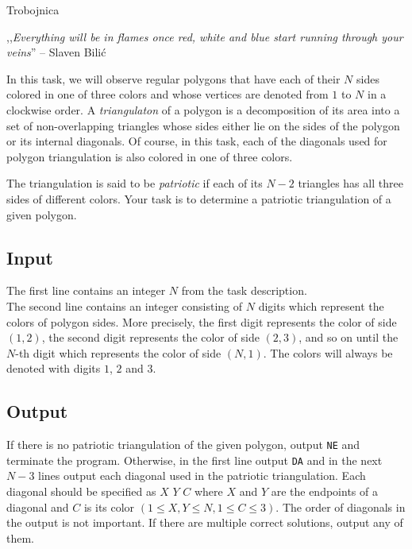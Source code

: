 \begin{statement}[
  problempoints=110,
  timelimit=1 second,
  memorylimit=512 MiB,
]{Trobojnica}



,,\textit{Everything will be in flames once red, white and blue start running through your veins}''
-- Slaven Bilić

In this task, we will observe regular polygons that have each of their $N$ sides
colored in one of three colors and whose vertices are denoted from $1$ to $N$
in a clockwise order. A \textit{triangulaton} of a polygon is a decomposition of
its area into a set of non-overlapping triangles whose sides either lie on the
sides of the polygon or its internal diagonals. Of course, in this task, each of
the diagonals used for polygon triangulation is also colored in one of three
colors.

The triangulation is said to be \textit{patriotic} if each of its $N-2$
triangles has all three sides of different colors. Your task is to determine
a patriotic triangulation of a given polygon.

\subsection*{Input}
The first line contains an integer $N$ from the task description. \\
The second line contains an integer consisting of $N$ digits which represent
the colors of polygon sides. More precisely, the first digit represents
the color of side $(1,2)$, the second digit represents the color of side $(2,3)$,
and so on until the $N$-th digit which represents the color of side $(N,1)$. The
colors will always be denoted with digits $1$, $2$ and $3$.

\subsection*{Output}
If there is no patriotic triangulation of the given polygon, output \texttt{NE}
and terminate the program. Otherwise, in the first line output \texttt{DA}
and in the next $N-3$ lines output each diagonal used in the patriotic
triangulation. Each diagonal should be specified as $X$ $Y$ $C$ where $X$ and
$Y$ are the endpoints of a diagonal and $C$ is its color
$(1 \le X, Y \le N, 1 \le C \le 3)$. The order of diagonals in the output is
not important. If there are multiple correct solutions, output any of them.


\end{statement}
